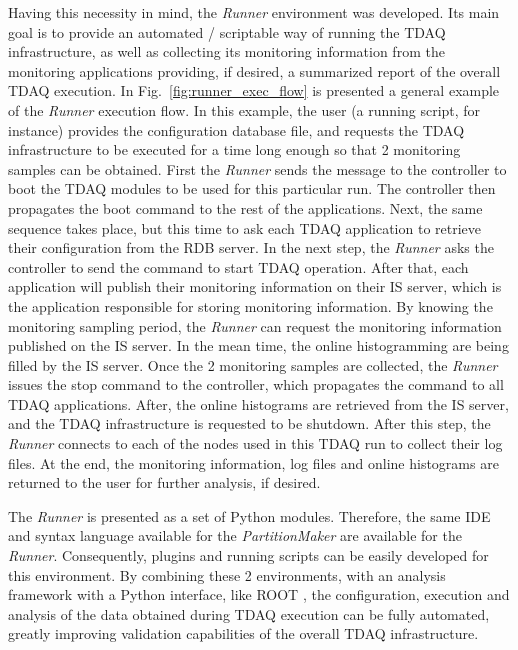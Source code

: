 Having this necessity in mind, the \emph{Runner} environment was developed. Its main goal is to provide an automated / scriptable way of running the TDAQ infrastructure, as well as collecting its monitoring information from the monitoring applications providing, if desired, a summarized report of the overall TDAQ execution. In Fig.~\ref{fig:runner_exec_flow} is presented a general example of the \emph{Runner} execution flow. In this example, the user (a running script, for instance) provides the configuration database file, and requests the TDAQ infrastructure to be executed for a time long enough so that 2 monitoring samples can be obtained. First the \emph{Runner} sends the message to the controller to boot the TDAQ modules to be used for this particular run. The controller then propagates the boot command to the rest of the applications. Next, the same sequence takes place, but this time to ask each TDAQ application to retrieve their configuration from the RDB server. In the next step, the \emph{Runner} asks the controller to send the command to start TDAQ operation. After that, each application will publish their monitoring information on their IS server, which is the application responsible for storing monitoring information. By knowing the monitoring sampling period, the \emph{Runner} can request the monitoring information published on the IS server. In the mean time, the online histogramming are being filled by the IS server. Once the 2 monitoring samples are collected, the \emph{Runner} issues the stop command to the controller, which propagates the command to all TDAQ applications. After, the online histograms are retrieved from the IS server, and the TDAQ infrastructure is requested to be shutdown. After this step, the \emph{Runner} connects to each of the nodes used in this TDAQ run to collect their log files. At the end, the monitoring information, log files and online histograms are returned to the user for further analysis, if desired.

The \emph{Runner} is presented as a set of Python modules. Therefore, the same IDE and syntax language available for the \emph{PartitionMaker} are available for the \emph{Runner}.  Consequently, plugins and running scripts can be easily developed for this environment. By combining these 2 environments, with an analysis framework with a Python interface, like ROOT \cite{bib:root}, the configuration, execution and analysis of the data obtained during TDAQ execution can be fully automated, greatly improving validation capabilities of the overall TDAQ infrastructure.


